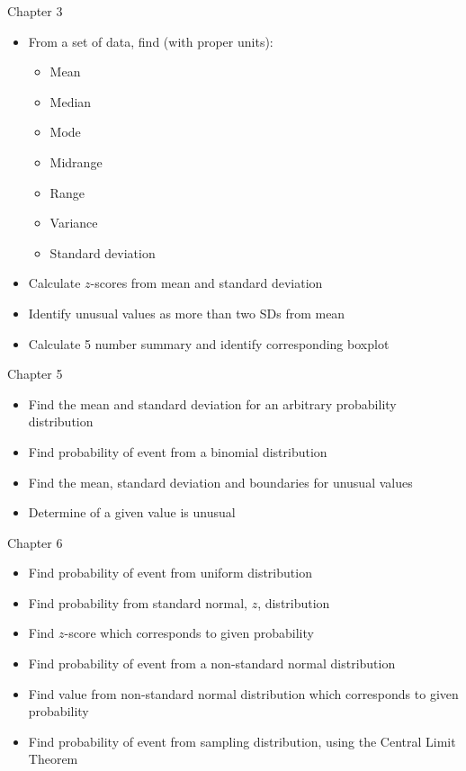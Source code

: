 \documentclass[xcolor=table]{beamer}
\begin{document}
\begin{frame}{Chapter 3}
\begin{block}{}
\large
\begin{itemize}
\item From a set of data, find (with proper units):
\begin{itemize}
\item Mean
\item Median
\item Mode
\item Midrange
\item Range
\item Variance
\item Standard deviation
\end{itemize}
\item Calculate $z$-scores from mean and standard deviation
\item Identify unusual values as more than two SDs from mean
\item Calculate 5 number summary and identify corresponding boxplot
\end{itemize}
\end{block}
\end{frame}

\begin{frame}{Chapter 5}
\begin{block}{}
\large
\begin{itemize}
\item Find the mean and standard deviation for an arbitrary probability distribution
\item Find probability of event from a binomial distribution
\item Find the mean, standard deviation and boundaries for unusual values
\item Determine of a given value is unusual
\end{itemize}
\end{block}
\end{frame}

\begin{frame}{Chapter 6}
\begin{block}{}
\large
\begin{itemize}
\item Find probability of event from uniform distribution
\item Find probability from standard normal, $z$, distribution
\item Find $z$-score which corresponds to given probability
\item Find probability of event from a non-standard normal distribution
\item Find value from non-standard normal distribution which corresponds to given probability
\item Find probability of event from sampling distribution, using the Central Limit Theorem
\end{itemize}
\end{block}
\end{frame}
\end{document}
